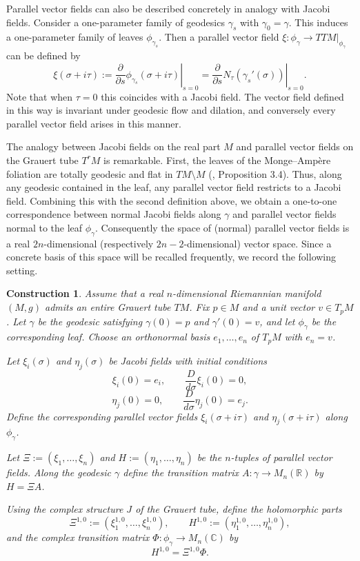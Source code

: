 \documentclass[a4paper, 12pt]{article}
\newtheorem{con}{Construction}[section]
\begin{document}
Parallel vector fields can also be described concretely in analogy with Jacobi fields. Consider a one-parameter family of geodesics $\gamma_s$ with $\gamma_0=\gamma$. This induces a one-parameter family of leaves $\phi_{\gamma_s}$. Then a parallel vector field $\xi:\phi_\gamma\to TTM|_{\phi_\gamma}$ can be defined by
\[
\xi(\sigma+i\tau):=\left.\frac{\partial}{\partial s}\phi_{\gamma_s}(\sigma+i\tau)\right|_{s=0}
=\left.\frac{\partial}{\partial s}N_\tau(\gamma_s'(\sigma))\right|_{s=0}.
\]
Note that when $\tau=0$ this coincides with a Jacobi field. The vector field defined in this way is invariant under geodesic flow and dilation, and conversely every parallel vector field arises in this manner.

The analogy between Jacobi fields on the real part $M$ and parallel vector fields on the Grauert tube $T^rM$ is remarkable. First, the leaves of the Monge--Amp\`ere foliation are totally geodesic and flat in $TM\setminus M$ (\cite{LS91}, Proposition 3.4). Thus, along any geodesic contained in the leaf, any parallel vector field restricts to a Jacobi field. Combining this with the second definition above, we obtain a one-to-one correspondence between normal Jacobi fields along $\gamma$ and parallel vector fields normal to the leaf $\phi_\gamma$. Consequently the space of (normal) parallel vector fields is a real $2n$-dimensional (respectively $2n-2$-dimensional) vector space. Since a concrete basis of this space will be recalled frequently, we record the following setting.

\begin{con}\label{setting}
Assume that a real $n$-dimensional Riemannian manifold $(M,g)$ admits an entire Grauert tube $TM$. Fix $p\in M$ and a unit vector $v\in T_pM$. Let $\gamma$ be the geodesic satisfying $\gamma(0)=p$ and $\gamma'(0)=v$, and let $\phi_\gamma$ be the corresponding leaf. Choose an orthonormal basis $e_1,\dots,e_n$ of $T_pM$ with $e_n=v$.  

Let $\xi_i(\sigma)$ and $\eta_j(\sigma)$ be Jacobi fields with initial conditions
\[
\xi_i(0)=e_i,\qquad \frac{D}{d\sigma}\xi_i(0)=0,
\]
\[
\eta_j(0)=0,\qquad \frac{D}{d\sigma}\eta_j(0)=e_j.
\]
Define the corresponding parallel vector fields $\xi_i(\sigma+i\tau)$ and $\eta_j(\sigma+i\tau)$ along $\phi_\gamma$.  

Let $\Xi:=(\xi_1,\dots,\xi_n)$ and $H:=(\eta_1,\dots,\eta_n)$ be the $n$-tuples of parallel vector fields. Along the geodesic $\gamma$ define the transition matrix $A:\gamma\to M_n(\mathbb{R})$ by $H=\Xi A$.  

Using the complex structure $J$ of the Grauert tube, define the holomorphic parts
\[
\Xi^{1,0}:=(\xi_1^{1,0},\dots,\xi_n^{1,0}),\qquad
H^{1,0}:=(\eta_1^{1,0},\dots,\eta_n^{1,0}),
\]
and the complex transition matrix $\Phi:\phi_\gamma\to M_n(\mathbb{C})$ by
\[
H^{1,0}=\Xi^{1,0}\Phi .
\]
\end{con}
\end{document}
